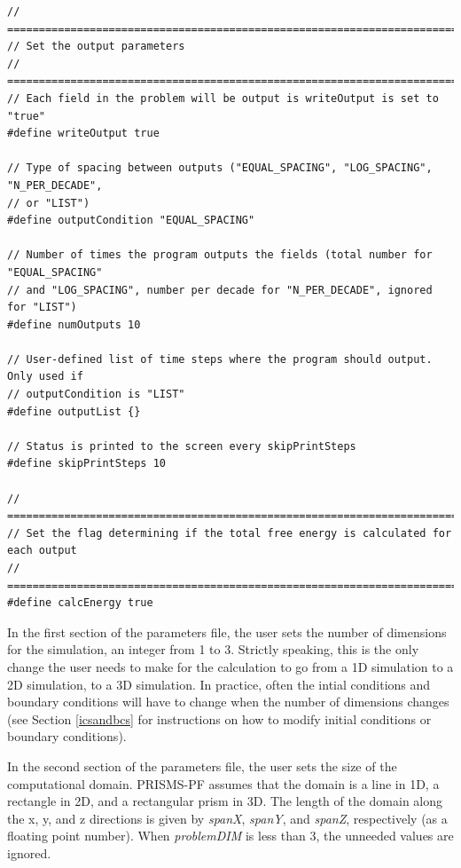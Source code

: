 \documentclass[10pt]{article} %
\begin{document}
\begin{lstlisting}
// =================================================================================
// Set the output parameters
// =================================================================================
// Each field in the problem will be output is writeOutput is set to "true"
#define writeOutput true

// Type of spacing between outputs ("EQUAL_SPACING", "LOG_SPACING", "N_PER_DECADE",
// or "LIST")
#define outputCondition "EQUAL_SPACING"

// Number of times the program outputs the fields (total number for "EQUAL_SPACING"
// and "LOG_SPACING", number per decade for "N_PER_DECADE", ignored for "LIST")
#define numOutputs 10

// User-defined list of time steps where the program should output. Only used if
// outputCondition is "LIST"
#define outputList {}

// Status is printed to the screen every skipPrintSteps
#define skipPrintSteps 10

// =================================================================================
// Set the flag determining if the total free energy is calculated for each output
// =================================================================================
#define calcEnergy true
\end{lstlisting}
\normalsize

In the first section of the parameters file, the user sets the number of dimensions for the simulation, an integer from 1 to 3. Strictly speaking, this is the only change the user needs to make for the calculation to go from a 1D simulation to a 2D simulation, to a 3D simulation. In practice, often the intial conditions and boundary conditions will have to change when the number of dimensions changes (see Section \ref{icsandbcs} for instructions on how to modify initial conditions or boundary conditions).

In the second section of the parameters file, the user sets the size of the computational domain. PRISMS-PF assumes that the domain is a line in 1D, a rectangle in 2D, and a rectangular prism in 3D. The length of the domain along the x, y, and z directions is given by \emph{spanX}, \emph{spanY}, and \emph{spanZ}, respectively (as a floating point number). When \emph{problemDIM} is less than 3, the unneeded values are ignored.
\end{document}
